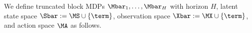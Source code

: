 







\iffalse
We define truncated block MDPs $\Mbar_1,\dots,\Mbar_H$ with horizon $H$, latent state space $\Sbar := \MS \cup \{\term\}$, observation space $\Xbar := \MX \cup \{\term\}$, and action space $\MA$ as follows. 

